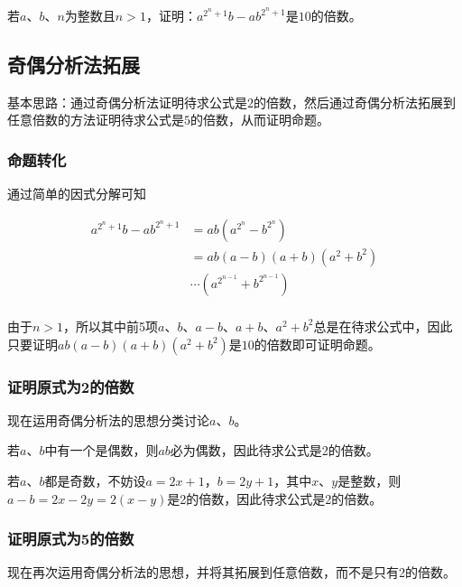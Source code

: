 

若$a$、$b$、$n$为整数且$n > 1$，证明：$a^{2^n+1}b - ab^{2^n+1}$是$10$的倍数。

\subsection{奇偶分析法拓展}

基本思路：通过奇偶分析法证明待求公式是$2$的倍数，然后通过奇偶分析法拓展到任意倍数的方法证明待求公式是$5$的倍数，从而证明命题。

\subsubsection{命题转化}

通过简单的因式分解可知

\vspace{-16pt}

\begin{align*}
  a^{2^n+1}b - ab^{2^n+1} &= ab(a^{2^n} - b^{2^n}) \\
  &= ab(a - b)(a + b)(a^2 + b^2) \\
  &\cdots(a^{2^{n-1}} + b^{2^{n-1}}) \\
\end{align*}

\vspace{-16pt}

由于$n > 1$，所以其中前5项$a$、$b$、$a - b$、$a + b$、$a^2 + b^2$总是在待求公式中，因此只要证明$ab(a - b)(a + b)(a^2 + b^2)$是$10$的倍数即可证明命题。

\subsubsection{证明原式为2的倍数}

现在运用奇偶分析法的思想分类讨论$a$、$b$。

若$a$、$b$中有一个是偶数，则$ab$必为偶数，因此待求公式是2的倍数。

若$a$、$b$都是奇数，不妨设$a = 2x + 1$，$b = 2y + 1$，其中$x$、$y$是整数，则$a - b = 2x - 2y = 2(x - y)$是2的倍数，因此待求公式是2的倍数。

\subsubsection{证明原式为5的倍数}

现在再次运用奇偶分析法的思想，并将其拓展到任意倍数，而不是只有2的倍数。

